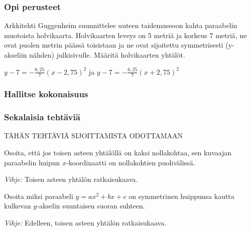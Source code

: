 \begin{tehtavasivu}

\subsubsection*{Opi perusteet}

\begin{tehtava}
Arkkitehti Guggenheim suunnittelee uuteen taidemuseoon kahta paraabelin muotoista holvikaarta. Holvikaarten leveys on 5 metriä ja korkeus 7 metriä, ne ovat puolen metrin päässä toisistaan ja ne ovat sijoitettu symmetrisesti (y-akseliin nähden) julkisivulle. Määritä holvikaarten yhtälöt.
\begin{vastaus}
$y-7 = -\frac{6,25}{7}(x - 2,75)^2$ ja $y-7 = -\frac{6,25}{7}(x + 2,75)^2$
\end{vastaus}
\end{tehtava}



\subsubsection*{Hallitse kokonaisuus}

\subsubsection*{Sekalaisia tehtäviä}

TÄHÄN TEHTÄVIÄ SIJOITTAMISTA ODOTTAMAAN

\begin{tehtava}
Osoita, että jos toisen asteen yhtälöllä on kaksi nollakohtaa, sen kuvaajan paraabelin huipun $x$-koordinaatti on nollakohtien puolivälissä.
\begin{vastaus}
    \emph{Vihje:} Toisen asteen yhtälön ratkaisukaava.
\end{vastaus}
\end{tehtava}

\begin{tehtava}
Osoita miksi paraabeli $y = ax^2 +bx +c$ on symmetrinen huippunsa kautta kulkevan $y$-akselin suuntaisen suoran suhteen.
\begin{vastaus}
    \emph{Vihje:} Edelleen, toisen asteen yhtälön ratkaisukaava.
\end{vastaus}
\end{tehtava}


\end{tehtavasivu}
